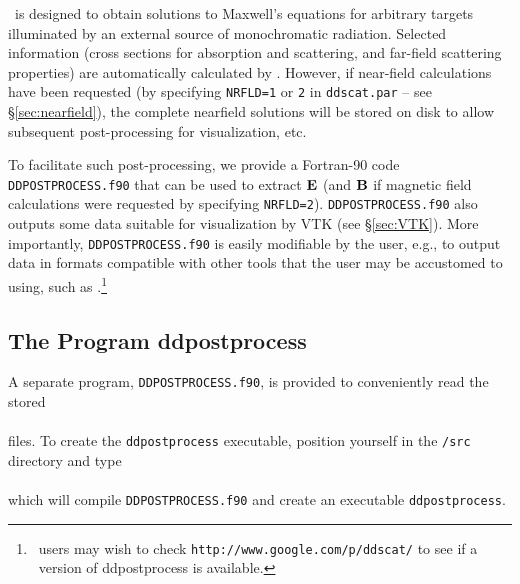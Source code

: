 \ddscatv\ is designed to obtain solutions to Maxwell's equations for
arbitrary targets illuminated by an external source of monochromatic
radiation.  Selected information (cross sections for absorption and scattering,
and far-field scattering properties) are automatically calculated by
\ddscatv.  However, if near-field calculations have been requested
(by specifying {\tt NRFLD=1} or {\tt 2} in {\tt ddscat.par} -- 
see \S\ref{sec:nearfield}),
the complete nearfield solutions will be stored on disk to allow
subsequent post-processing for visualization, etc.

To facilitate such post-processing, we provide a Fortran-90 code
{\tt DDPOSTPROCESS.f90} that can be used to extract ${\bf E}$ (and ${\bf B}$ if
magnetic field calculations were requested by specifying {\tt NRFLD=2}).
{\tt DDPOSTPROCESS.f90} also outputs some data suitable for
visualization by VTK (see \S\ref{sec:VTK}).
More importantly, {\tt DDPOSTPROCESS.f90} is easily modifiable by
the user, e.g., to output data in formats compatible with other tools that the
user may be accustomed to using, such as \Matlab.\footnote{%
   \Matlab\ users may wish to 
   check {\tt http://www.google.com/p/ddscat/} to
   see if a \Matlab\ version of ddpostprocess is available.}

\subsection{The Program ddpostprocess
            \label{sec:ddpostprocess}}

A separate program, {\tt DDPOSTPROCESS.f90}, is provided to conveniently
read the stored\\ 
\indent{}\\
files.  To create the {\tt ddpostprocess} executable, position yourself in the
{\tt /src} directory and type\\
\indent{}\\
which will compile {\tt DDPOSTPROCESS.f90} and
create an executable {\tt ddpostprocess}.

